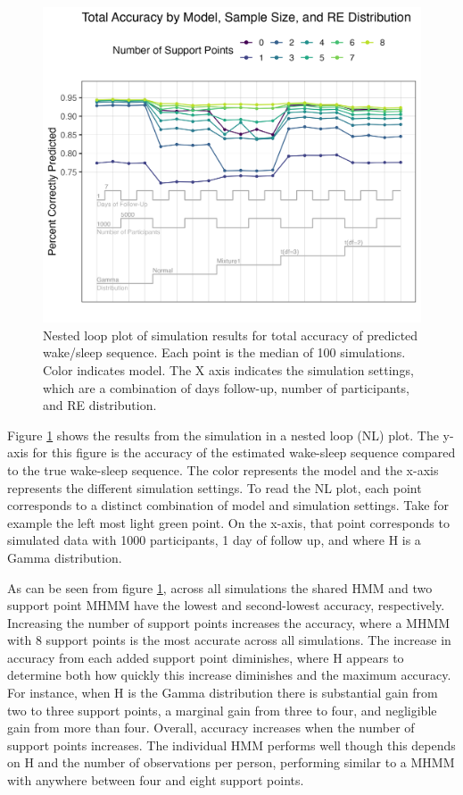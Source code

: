 \documentclass[num-refs]{wiley-article}
\begin{document}
\begin{figure}
    \includegraphics[scale=.8]{Support/NestedLoopAcc.png}
    \centering
    \caption{Nested loop plot of simulation results for total accuracy of predicted wake/sleep sequence. Each point is the median of 100 simulations. Color indicates model. The X axis indicates the simulation settings, which are a combination of days follow-up, number of participants, and RE distribution.}
    \label{NLacc}
\end{figure}
    
Figure \ref{NLacc} shows the results from the simulation in a nested loop (NL) plot. The y-axis for this figure is the accuracy of the estimated wake-sleep sequence compared to the true wake-sleep sequence. The color represents the model and the x-axis represents the different simulation settings. To read the NL plot, each point corresponds to a distinct combination of model and simulation settings. Take for example the left most light green point. On the x-axis, that point corresponds to simulated data with 1000 participants, 1 day of follow up, and where H is a Gamma distribution.

As can be seen from figure \ref{NLacc}, across all simulations the shared HMM and two support point MHMM have the lowest and second-lowest accuracy, respectively. Increasing the number of support points increases the accuracy, where a MHMM with 8 support points is the most accurate across all simulations. The increase in accuracy from each added support point diminishes, where H appears to determine both how quickly this increase diminishes and the maximum accuracy. For instance, when H is the Gamma distribution there is substantial gain from two to three support points, a marginal gain from three to four, and negligible gain from more than four. Overall, accuracy increases when the number of support points increases. The individual HMM performs well though this depends on H and the number of observations per person, performing similar to a MHMM with anywhere between four and eight support points. 
 
\end{document}

